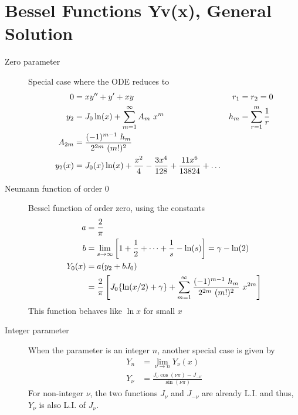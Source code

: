 \section{Bessel Functions Yv(x), General Solution}
\begin{description}
    \item[Zero parameter] Special case where the ODE reduces to
        \begin{align}
            0      & = xy'' + y' + xy                                   &
            r_1    & = r_2 = 0                                            \\
            y_2    & = J_0 \ln(x) + \iser{1}A_m\ x^m                    &
            h_m    & = \sum_{r=1}^{m} \frac{1}{r}                         \\
            A_{2m} & = \frac{(-1)^{m-1}\ h_m}{2^{2m}\ (m!)^2}             \\
            y_2(x) & = J_0(x) \ln(x) + \frac{x^2}{4} - \frac{3x^4}{128}
            + \frac{11x^6}{13824} + \dots
        \end{align}

    \item[Neumann function of order 0] Bessel function of order zero, using the constants
        \begin{align}
            a      & = \frac{2}{\pi}                                              \\
            b      & = \lim_{s \rightarrow \infty} \left[ 1 + \frac{1}{2} + \dots
            + \frac{1}{s} - \ln(s) \right] = \gamma - \ln(2)                      \\
            Y_0(x) & = a(y_2 + bJ_0)                                              \\
                   & = \frac{2}{\pi} \left[ J_0 \{\ln(x/2) + \gamma\}
                + \iser{1} \frac{(-1)^{m-1}\ h_m}{2^{2m}\ (m!)^2}\ x^{2m} \right]
        \end{align}
        This function behaves like $ \ln x $ for small $ x $

    \item[Integer parameter] When the parameter is an integer $ n $, another special case
        is given by
        \begin{align}
            Y_n   & = \lim_{\nu \rightarrow n}Y_\nu (x)                    \\
            Y_\nu & = \frac{J_\nu \cos(\nu \pi) - J_{-\nu}}{\sin(\nu \pi)}
        \end{align}
        For non-integer $ \nu $, the two functions $ J_\nu $ and $ J_{-\nu} $ are
        already L.I. and thus, $ Y_\nu $ is also L.I. of $ J_\nu $. \par


\end{description}
